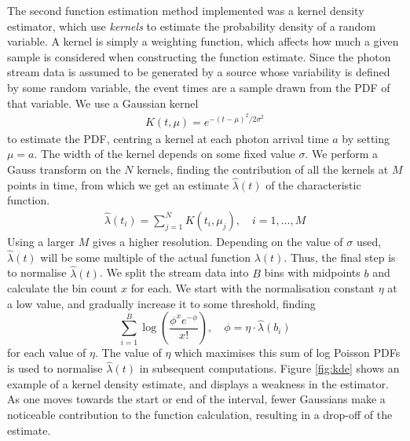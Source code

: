 \documentclass[a4paper,11pt,twoside]{article}
\begin{document}
   The second function estimation method implemented was a kernel density
   estimator, which use \emph{kernels} to estimate the probability density of a
   random variable. A kernel is simply a weighting function, which affects how
   much a given sample is considered when constructing the function
   estimate. Since the photon stream data is assumed to be generated by a source
   whose variability is defined by some random variable, the event times are a
   sample drawn from the PDF of that variable. We use a Gaussian kernel
   \begin{align}
   K(t,\mu)=e^{-(t-\mu)^2/2\sigma^2}
   \end{align}
   to estimate the PDF, centring a kernel at each photon arrival time $a$ by
   setting $\mu=a$. The width of the kernel depends on some fixed value
   $\sigma$. We perform a Gauss transform on the $N$ kernels, finding the
   contribution of all the kernels at $M$ points in time, from which we get an
   estimate $\hat{\lambda}(t)$ of the characteristic function.
   \begin{align}
   \hat{\lambda}(t_i) = \sum_{j=1}^N K(t_i,\mu_j), \quad i=1,\dots,M
   \end{align}
   Using a larger $M$ gives a higher resolution. Depending on the value of
   $\sigma$ used, $\hat{\lambda}(t)$ will be some multiple of the actual
   function $\lambda(t)$. Thus, the final step is to normalise
   $\hat{\lambda}(t)$. We split the stream data into $B$ bins with midpoints $b$
   and calculate the bin count $x$ for each. We start with the normalisation
   constant $\eta$ at a low value, and gradually increase it to some threshold,
   finding
   \begin{equation}\label{eq:normcalc}
   \sum_{i=1}^B
   \log\left(\frac{\phi^xe^{-\phi}}{x!}\right), \quad \phi=\eta\cdot\hat{\lambda}(b_i)
   \end{equation}
   for each value of $\eta$. The value of $\eta$ which maximises this sum of log
   Poisson PDFs is used to normalise $\hat{\lambda}(t)$ in subsequent
   computations. Figure \ref{fig:kde} shows an example of a kernel density
   estimate, and displays a weakness in the estimator. As one moves towards the
   start or end of the interval, fewer Gaussians make a noticeable contribution
   to the function calculation, resulting in a drop-off of the estimate.
\end{document}
